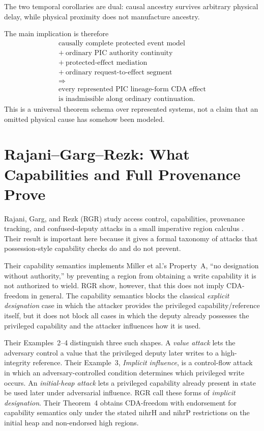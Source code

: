 \documentclass[10pt,twocolumn]{article}
\begin{document}
The two temporal corollaries are dual: causal ancestry survives arbitrary
physical delay, while physical proximity does not manufacture ancestry.

The main implication is therefore
\begin{equation}
\boxed{
\begin{gathered}
\text{causally complete protected event model}\\
+\ \text{ordinary PIC authority continuity}\\
+\ \text{protected-effect mediation}\\
+\ \text{ordinary request-to-effect segment}\\
\Longrightarrow\\
\text{every represented PIC lineage-form CDA effect}\\
\text{is inadmissible along ordinary continuation.}
\end{gathered}}
\label{eq:universal-cda-chain}
\end{equation}
This is a universal theorem schema over represented systems, not a claim that
an omitted physical cause has somehow been modeled.



\section{Rajani--Garg--Rezk: What Capabilities and Full Provenance Prove}
\label{sec:rgr}

Rajani, Garg, and Rezk (RGR) study access control, capabilities, provenance
tracking, and confused-deputy attacks in a small imperative region calculus
\cite{rajani_garg_rezk2016}.  Their result is important here because it gives a
formal taxonomy of attacks that possession-style capability checks do and do
not prevent.

Their capability semantics implements Miller et al.'s Property~A, ``no
designation without authority,'' by preventing a region from obtaining a write
capability it is not authorized to wield.  RGR show, however, that this does
not imply CDA-freedom in general.  The capability semantics blocks the
classical \emph{explicit designation} case in which the attacker provides the
privileged capability/reference itself, but it does not block all cases in
which the deputy already possesses the privileged capability and the attacker
influences how it is used.

Their Examples~2--4 distinguish three such shapes.  A \emph{value attack}
lets the adversary control a value that the privileged deputy later writes to a
high-integrity reference.  Their Example~3, \emph{Implicit influence}, is a
control-flow attack in which an adversary-controlled condition determines which
privileged write occurs.  An
\emph{initial-heap attack} lets a privileged capability already present in
state be used later under adversarial influence.  RGR call these forms of
\emph{implicit designation}.  Their Theorem~4 obtains CDA-freedom with
endorsement for capability semantics only under the stated $\mathrm{nihrH}$ and
$\mathrm{nihrP}$ restrictions on the initial heap and non-endorsed high regions.
\end{document}
